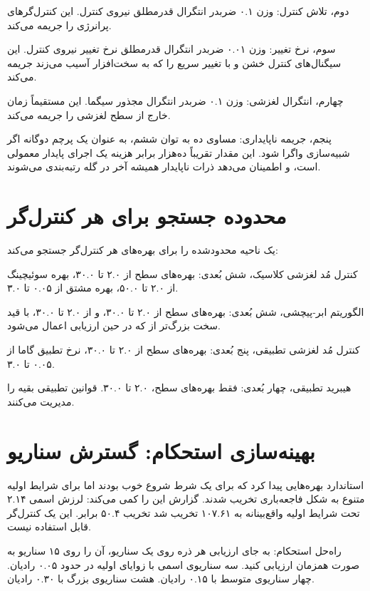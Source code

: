 \documentclass[12pt, a4paper]{article}
\newcommand{\dash}{\lr{---}}
\begin{document}
دوم، تلاش کنترل: وزن ۰.۱ ضربدر انتگرال قدرمطلق نيروی کنترل. اين کنترل‌گرهای پرانرژی را جريمه می‌کند.

سوم، نرخ تغيير: وزن ۰.۰۱ ضربدر انتگرال قدرمطلق نرخ تغيير نيروی کنترل. اين سيگنال‌های کنترل خشن و با تغيير سريع را که به سخت‌افزار آسيب می‌زند جريمه می‌کند.

چهارم، انتگرال لغزشی: وزن ۰.۱ ضربدر انتگرال مجذور سيگما. اين مستقيماً زمان خارج از سطح لغزشی را جريمه می‌کند.

پنجم، جريمه ناپايداری:  مساوی ده به توان ششم، به عنوان يک پرچم دوگانه اگر شبيه‌سازی واگرا شود. اين مقدار تقريباً ده‌هزار برابر هزينه يک اجرای پايدار معمولی است، و اطمينان می‌دهد ذرات ناپايدار هميشه آخر در گله رتبه‌بندی می‌شوند.

\section{محدوده جستجو برای هر کنترل‌گر}

 يک ناحيه محدودشده را برای بهره‌های هر کنترل‌گر جستجو می‌کند:

کنترل مُد لغزشی کلاسيک، شش بُعدی: بهره‌های سطح از ۲.۰ تا ۳۰.۰، بهره سوئيچينگ  از ۲.۰ تا ۵۰.۰، بهره مشتق  از ۰.۰۵ تا ۳.۰.

الگوريتم ابر-پيچشی، شش بُعدی: بهره‌های سطح از ۲.۰ تا ۳۰.۰،  و  از ۲.۰ تا ۳۰.۰، با قيد سخت  بزرگ‌تر از  که در حين ارزيابی اعمال می‌شود.

کنترل مُد لغزشی تطبيقی، پنج بُعدی: بهره‌های سطح از ۲.۰ تا ۳۰.۰، نرخ تطبيق گاما از ۰.۰۵ تا ۳.۰.

هيبريد تطبيقی، چهار بُعدی: فقط بهره‌های سطح، ۲.۰ تا ۳۰.۰. قوانين تطبيقی بقيه را مديريت می‌کنند.

\section{بهينه‌سازی استحکام: گسترش سناريو}

 استاندارد بهره‌هايی پيدا کرد که برای يک شرط شروع خوب بودند اما برای شرايط اوليه متنوع به شکل فاجعه‌باری تخريب شدند. گزارش اين را کمی می‌کند: لرزش اسمی ۲.۱۴ تحت شرايط اوليه واقع‌بينانه به ۱۰۷.۶۱ تخريب شد \dash{} تخريب ۵۰.۴ برابر. اين يک کنترل‌گر قابل استفاده نيست.

راه‌حل  استحکام: به جای ارزيابی هر ذره روی يک سناريو، آن را روی ۱۵ سناريو به صورت همزمان ارزيابی کنيد. سه سناريوی اسمی با زوايای اوليه در حدود ۰.۰۵ رادیان. چهار سناريوی متوسط با ۰.۱۵ رادیان. هشت سناريوی بزرگ با ۰.۳۰ رادیان.
\end{document}
